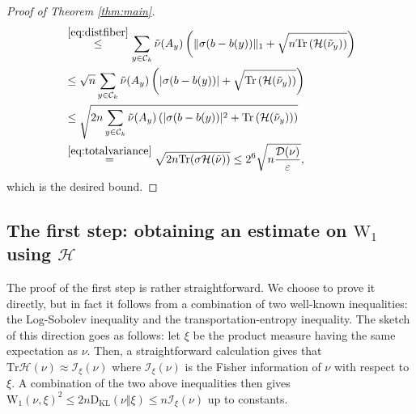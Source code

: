 \documentclass[12pt]{article}
\def \I{\mathcal{I}}
\def \W{\mathrm{W_1}}
\def \eps {\varepsilon}
\def \tr {\mathrm{Tr}}
\def \KL {\mathrm{D}_{\mathrm{KL}}}
\def \HH {\mathcal{H}}
\def \Comp { \mathcal{D} }
\theoremstyle{definition}
\theoremstyle{remark}
\begin{document}
\begin{proof}[Proof of Theorem \ref{thm:main}]
\begin{align*}
& \stackrel{\eqref{eq:distfiber}}{\leq} \sum_{y \in \mathcal{C}_k} \tilde \nu(A_y) \left ( \Vert \sigma (b - b(y)) \Vert_1 + \sqrt{n \tr \left (\HH(\tilde \nu_y) \right )} \right ) \\
& \leq \sqrt{n} \sum_{y \in \mathcal{C}_k} \tilde \nu(A_y) \left ( | \sigma (b - b(y)) | + \sqrt{\tr \left (\HH(\tilde \nu_y) \right )} \right ) \\
& \leq \sqrt{2 n \sum_{y \in \mathcal{C}_k} \tilde \nu(A_y) \left ( | \sigma (b - b(y)) |^2 + \tr \left (\HH(\tilde \nu_y) \right ) \right ) } \\
& \stackrel{ \eqref{eq:totalvariance} }{=} \sqrt{2 n \tr(\sigma \HH(\tilde \nu))} \leq 2^6 \sqrt{n \frac{\Comp(\nu)}{\eps}},
\end{align*}
which is the desired bound.
\end{proof}
\subsection{The first step: obtaining an estimate on $\W$ using $\HH$}
The proof of the first step is rather straightforward. We choose to prove it directly, but in fact it follows from a combination of two well-known inequalities: the Log-Sobolev inequality and the transportation-entropy inequality. The sketch of this direction goes as follows: let $\xi$ be the product measure having the same expectation as $\nu$. Then, a straightforward calculation gives that $\tr \HH(\nu) \approx \I_\xi(\nu)$ where $\I_\xi(\nu)$ is the Fisher information of $\nu$ with respect to $\xi$. A combination of the two above inequalities then gives $\W(\nu, \xi)^2 \leq 2 n \KL(\nu \Vert \xi) \leq n \I_\xi(\nu)$ up to constants.
\end{document}
